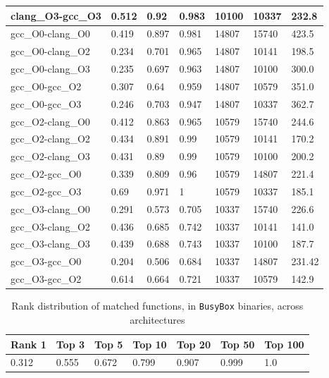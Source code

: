 \begin{appendices}
\begin{table}[!ht]
\begin{tabular}{ | p{2.28cm} | p{0.57cm} | p{0.57cm} | p{0.57cm} | p{0.57cm} | p{0.57cm} | p{0.57cm} | }
	clang\_O3-gcc\_O3 & 0.512 & 0.92 & 0.983 & 10100 & 10337 & 232.8 \\ \hline
	gcc\_O0-clang\_O0 & 0.419 & 0.897 & 0.981 & 14807 & 15740 & 423.5 \\ \hline
	gcc\_O0-clang\_O2 & 0.234 & 0.701 & 0.965 & 14807 & 10141 & 198.5 \\ \hline
	gcc\_O0-clang\_O3 & 0.235 & 0.697 & 0.963 & 14807 & 10100 & 300.0 \\ \hline
	gcc\_O0-gcc\_O2 & 0.307 & 0.64 & 0.959 & 14807 & 10579 & 351.0 \\ \hline
	gcc\_O0-gcc\_O3 & 0.246 & 0.703 & 0.947 & 14807 & 10337 & 362.7 \\ \hline
	gcc\_O2-clang\_O0 & 0.412 & 0.863 & 0.965 & 10579 & 15740 & 244.6 \\ \hline
	gcc\_O2-clang\_O2 & 0.434 & 0.891 & 0.99 & 10579 & 10141 & 170.2 \\ \hline
	gcc\_O2-clang\_O3 & 0.431 & 0.89 & 0.99 & 10579 & 10100 & 200.2 \\ \hline
	gcc\_O2-gcc\_O0 & 0.339 & 0.809 & 0.96 & 10579 & 14807 & 221.4 \\ \hline
	gcc\_O2-gcc\_O3 & 0.69 & 0.971 & 1 & 10579 & 10337 & 185.1 \\ \hline
	gcc\_O3-clang\_O0 & 0.291 & 0.573 & 0.705 & 10337 & 15740 & 226.6 \\ \hline
	gcc\_O3-clang\_O2 & 0.436 & 0.685 & 0.742 & 10337 & 10141 & 141.0 \\ \hline
	gcc\_O3-clang\_O3 & 0.439 & 0.688 & 0.743 & 10337 & 10100 & 187.7\\ \hline
	gcc\_O3-gcc\_O0 & 0.204 & 0.506 & 0.684 & 10337 & 14807 & 231.42 \\ \hline
	gcc\_O3-gcc\_O2 & 0.614 & 0.664 & 0.721 & 10337 & 10579 & 142.9 \\ \hline
	\end{tabular}%
\end{table}%

\begin{table}[!ht]
\begin{center}
\caption{Rank distribution of matched functions, in \texttt{BusyBox} binaries, across architectures}
		\label{tab:x86_x64_box}
		\scriptsize
\begin{tabular}{ | l | l | l | l | l | l | l | }
\hline
	Rank 1 & Top 3 & Top 5 & Top 10 & Top 20 & Top 50 & Top 100 \\ \hline
	0.312 & 0.555 & 0.672 & 0.799 & 0.907 & 0.999 & 1.0 \\ \hline
\end{tabular}
\end{center}
\end{table}



\end{appendices}
